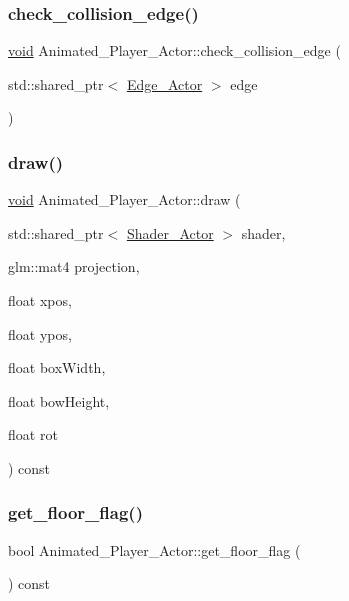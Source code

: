 \subsubsection{\texorpdfstring{check\+\_\+collision\+\_\+edge()}{check\_collision\_edge()}}
{\footnotesize\ttfamily \hyperlink{imgui__impl__opengl3__loader_8h_ac668e7cffd9e2e9cfee428b9b2f34fa7}{void} Animated\+\_\+\+Player\+\_\+\+Actor\+::check\+\_\+collision\+\_\+edge (\begin{DoxyParamCaption}\item[{std\+::shared\+\_\+ptr$<$ \hyperlink{classEdge__Actor}{Edge\+\_\+\+Actor} $>$}]{edge }\end{DoxyParamCaption})}

\mbox{\label{classAnimated__Player__Actor_a0f47a39cced0b631b6e6ef75243ef181}} 
\subsubsection{\texorpdfstring{draw()}{draw()}}
{\footnotesize\ttfamily \hyperlink{imgui__impl__opengl3__loader_8h_ac668e7cffd9e2e9cfee428b9b2f34fa7}{void} Animated\+\_\+\+Player\+\_\+\+Actor\+::draw (\begin{DoxyParamCaption}\item[{std\+::shared\+\_\+ptr$<$ \hyperlink{classShader__Actor}{Shader\+\_\+\+Actor} $>$}]{shader,  }\item[{glm\+::mat4}]{projection,  }\item[{float}]{xpos,  }\item[{float}]{ypos,  }\item[{float}]{box\+Width,  }\item[{float}]{bow\+Height,  }\item[{float}]{rot }\end{DoxyParamCaption}) const}

\mbox{\label{classAnimated__Player__Actor_a5b8cbfd84d0663e73d11f92d91349081}} 
\subsubsection{\texorpdfstring{get\+\_\+floor\+\_\+flag()}{get\_floor\_flag()}}
{\footnotesize\ttfamily bool Animated\+\_\+\+Player\+\_\+\+Actor\+::get\+\_\+floor\+\_\+flag (\begin{DoxyParamCaption}{ }\end{DoxyParamCaption}) const\hspace{0.3cm}{\ttfamily [inline]}}

